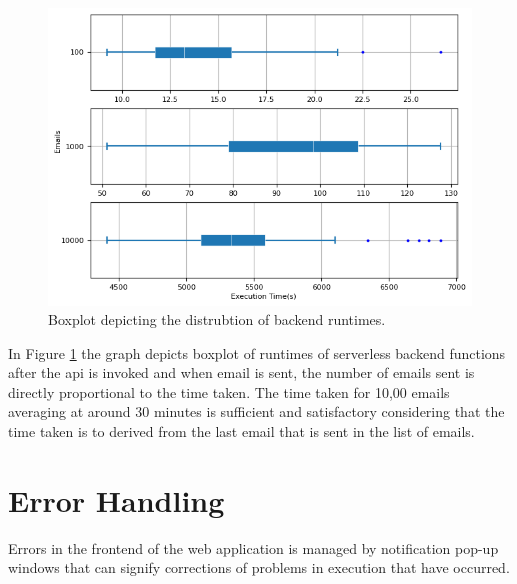 \begin{figure}[H]

	\centering
\includegraphics[width=\textwidth]{figures/general_analysis.png}
	\caption{Boxplot depicting the distrubtion of backend runtimes.}
	\label{fig:general}
\end{figure}
In Figure \ref{fig:general} the graph depicts boxplot of runtimes of serverless backend functions after the api is invoked and when email is sent, the number of emails sent is directly proportional to the time taken. The time taken for 10,00 emails averaging at around 30 minutes is sufficient and satisfactory considering that the time taken is to derived from the last email that is sent in the list of emails.  
\section{Error Handling}

Errors in the frontend of the web application is managed by notification pop-up windows that can signify corrections of problems in execution that have occurred.

	

